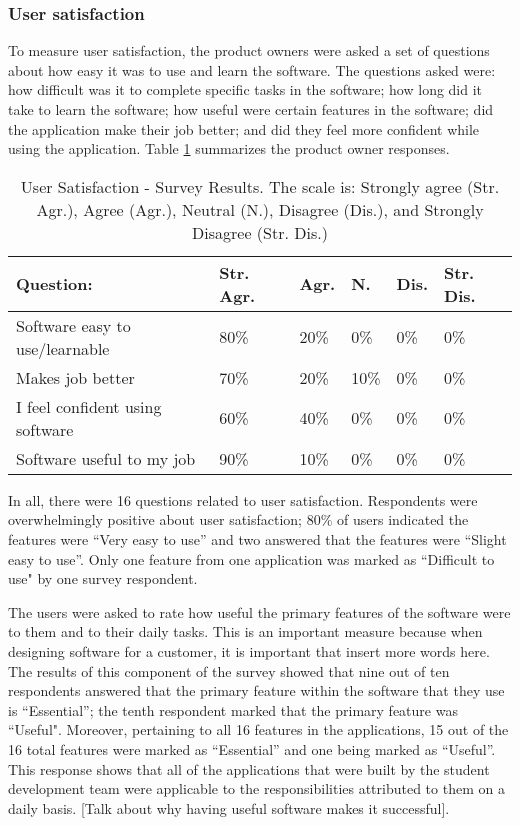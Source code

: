 \subsubsection{User satisfaction}
To measure user satisfaction, the product owners were asked a set of questions about how easy it was to use and learn the software. The questions asked were: how difficult was it to complete specific tasks in the software; how long did it take to learn the software; how useful were certain features in the software; did the application make their job better; and did they feel more confident while using the application. Table \ref{table:usersatisfaction} summarizes the product owner responses. 

\begin{table}
\caption{User Satisfaction - Survey Results. The scale is: Strongly agree (Str. Agr.), Agree (Agr.), Neutral (N.), Disagree (Dis.), and Strongly Disagree (Str. Dis.)}
\label{table:usersatisfaction}
\begin{tabular}{p{2.6cm}p{.75cm}p{.75cm}p{.75cm}p{.75cm}p{.75cm}}
Question: & Str. Agr. & Agr. & N. & Dis. & Str. Dis. \\
 \hline
Software easy to use/learnable & 80\% & 20\% & 0\% & 0\% & 0\% \\
Makes job better & 70\% & 20\% & 10\% & 0\% & 0\% \\
I feel confident using software & 60\% & 40\% & 0\% & 0\% & 0\% \\
Software useful to my job & 90\% & 10\% & 0\% & 0\% & 0\% \\
\end{tabular}
\end{table}

In all, there were 16 questions related to user satisfaction. Respondents were overwhelmingly positive about user satisfaction; 80\% of users indicated the features were ``Very easy to use'' and two answered that the features were ``Slight easy to use''. Only one feature from one application was marked as ``Difficult to use" by one survey respondent.

The users were asked to rate how useful the primary features of the software were to them and to their daily tasks. This is an important measure because when designing software for a customer, it is important that {insert more words here}. The results of this component of the survey showed that nine out of ten respondents answered that the primary feature within the software that they use is ``Essential''; the tenth respondent marked that the primary feature was ``Useful". Moreover, pertaining to all 16 features in the applications, 15 out of the 16 total features were marked as ``Essential'' and one being marked as ``Useful''. This response shows that all of the applications that were built by the student development team were applicable to the responsibilities attributed to them on a daily basis. [Talk about why having useful software makes it successful].

